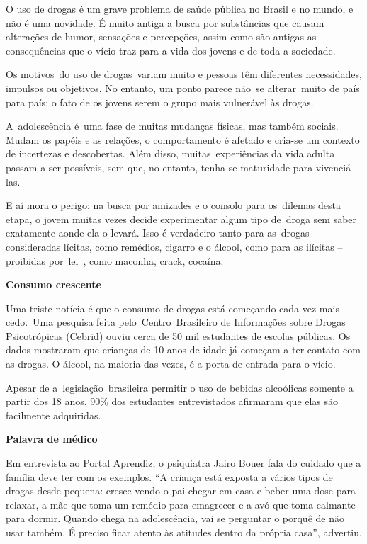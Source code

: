 \begin{itemize}
\begin{itemize}
O uso de drogas é um grave problema de saúde pública no Brasil e no
mundo, e não é uma novidade. É muito antiga a busca por substâncias que
causam alterações de humor, sensações e percepções, assim como são
antigas as consequências que o vício traz para a vida dos jovens e de
toda a sociedade.

Os motivos~do uso de drogas~variam muito e pessoas têm diferentes
necessidades, impulsos ou objetivos. No entanto, um ponto parece não~se
alterar~muito de país para país: o fato de os jovens serem o grupo mais
vulnerável às drogas.

A~adolescência é~uma fase de muitas mudanças físicas, mas também
sociais. Mudam os papéis e as relações, o comportamento é afetado e
cria-se um contexto de incertezas e descobertas. Além disso,
muitas~experiências da vida adulta passam a ser possíveis, sem que, no
entanto, tenha-se maturidade para vivenciá-las.

E aí mora o perigo: na busca por amizades e o consolo para os~dilemas
desta etapa, o jovem muitas vezes decide experimentar algum tipo
de~droga sem saber exatamente aonde ela o levará. Isso é verdadeiro
tanto para as~drogas consideradas lícitas, como remédios, cigarro e o
álcool, como para as ilícitas -- proibidas por~lei~, como maconha,
crack, cocaína.

\textbf{Consumo crescente}

Uma triste notícia é que o consumo de drogas está começando cada vez
mais cedo.~Uma pesquisa feita pelo~Centro~Brasileiro de Informações
sobre Drogas Psicotrópicas (Cebrid) ouviu cerca de 50 mil estudantes de
escolas públicas. Os dados mostraram que crianças de 10 anos de idade já
começam a ter contato com as drogas. O álcool, na maioria das vezes, é a
porta de entrada para o vício.

Apesar de a~legislação~brasileira permitir o uso de bebidas alcoólicas
somente a partir dos 18 anos, 90\% dos estudantes entrevistados
afirmaram que elas são facilmente adquiridas.

\textbf{Palavra de médico}

Em entrevista ao Portal Aprendiz, o psiquiatra Jairo Bouer fala do
cuidado que a família deve ter com os exemplos. ``A criança está exposta
a vários tipos de drogas desde pequena: cresce vendo o pai chegar em
casa e beber uma dose para relaxar, a mãe que toma um remédio para
emagrecer e a avó que toma calmante para dormir. Quando chega na
adolescência, vai se perguntar o porquê de não usar também. É preciso
ficar atento às atitudes dentro da própria casa'', advertiu.


\end{itemize}
\end{itemize}
